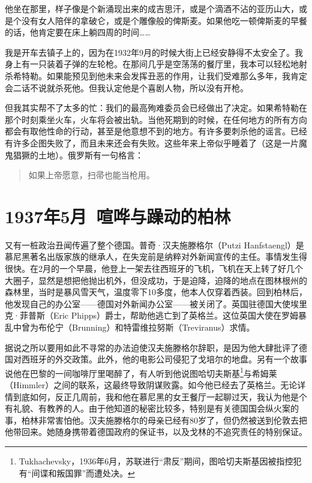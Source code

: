 \documentclass[UTF8]{ctexart}
\begin{document}
他坐在那里，样子像是个新涌现出来的成吉思汗，或是个滴酒不沾的亚历山大，或是个没有女人陪伴的拿破仑，或是个雕像般的俾斯麦。如果他吃一顿俾斯麦的早餐的话，他肯定要在床上躺四周的时间……

我是开车去镇子上的，因为在1932年9月的时候大街上已经安静得不太安全了。我身上有一只装着子弹的左轮枪。在那间几乎是空荡荡的餐厅里，我本可以轻松地射杀希特勒。如果能预见到他未来会发挥丑恶的作用，让我们受难那么多年，我肯定会二话不说就杀死他。但我认定他是个喜剧人物，所以没有开枪。

但我其实帮不了太多的忙：我们的最高殉难委员会已经做出了决定。如果希特勒在那个时刻乘坐火车，火车将会被出轨。当他死期到的时候，在任何地方的所有方向都会有取他性命的行动，甚至是他意想不到的地方。有许多要刺杀他的谣言。已经有许多企图失败了，而且未来还会有失败。这些年来上帝似乎睡着了（这是一片魔鬼猖獗的土地）。俄罗斯有一句格言：

\begin{verse}
如果上帝愿意，扫帚也能当枪用。
\end{verse}

\section{1937年5月\ 喧哗与躁动的柏林}

又有一桩政治丑闻传遍了整个德国。普奇·汉夫施滕格尔（Putzi Hanfstaengl）是慕尼黑著名出版家族的继承人，在失宠前是纳粹对外新闻宣传的主任。事情发生得很快。在2月的一个早晨，他登上一架去往西班牙的飞机，飞机在天上转了好几个大圈子，显然是想把他抛出机外，但没成功，于是迫降，迫降的地点在图林根州的森林里，当时是暴风雪天气，温度零下10多度，他本人仅穿着西装。回到柏林后，他发现自己的办公室——德国对外新闻办公室——被关闭了。英国驻德国大使埃里克·菲普斯（Eric Phipps）爵士，帮助他逃亡到了英格兰。这位英国大使在罗姆暴乱中曾为布伦宁（Brunning）和特雷维拉努斯（Treviranus）求情。

据说之所以要用如此不寻常的办法迫使汉夫施滕格尔辞职，是因为他大肆批评了德国对西班牙的外交政策。此外，他的电影公司侵犯了戈培尔的地盘。另有一个故事说他在巴黎的一间咖啡厅里喝醉了，有人听到他说图哈切夫斯基\footnote{Tukhachevsky，1936年6月，苏联进行“肃反”期间，图哈切夫斯基因被指控犯有“间谍和叛国罪”而遭处决。}与希姆莱（Himmler）之间的联系，这最终导致阴谋败露。如今他已经去了英格兰。无论详情到底如何，反正几周前，我和他在慕尼黑的女王餐厅一起聊过天，我认为他是个有礼貌、有教养的人。由于他知道的秘密比较多，特别是有关德国国会纵火案的事，柏林非常害怕他。汉夫施滕格尔的母亲已经有80岁了，但仍然被送到伦敦去把他带回来。她随身携带着德国政府的保证书，以及戈林的不追究责任的特别保证。
\end{document}
